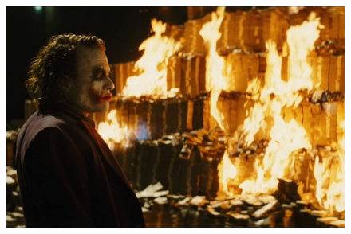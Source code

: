 \documentclass[xcolor=dvipsnames]{beamer}
\begin{document}
\begin{frame}
	\begin{figure}
	\begin{center}
 	\includegraphics[scale=0.65]{joker.jpg}
	\end{center}
	\end{figure}
\end{frame}


\end{document}
